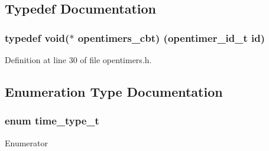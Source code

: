\subsection{Typedef Documentation}
\subsubsection[{\texorpdfstring{opentimers\+\_\+cbt}{opentimers_cbt}}]{\setlength{\rightskip}{0pt plus 5cm}typedef {\bf void}($\ast$ opentimers\+\_\+cbt) ({\bf opentimer\+\_\+id\+\_\+t} id)}\hypertarget{group___open_timers_ga93a6f1f7e03cd8ad88cbd9509db173cf}{}\label{group___open_timers_ga93a6f1f7e03cd8ad88cbd9509db173cf}


Definition at line 30 of file opentimers.\+h.



\subsection{Enumeration Type Documentation}
\subsubsection[{\texorpdfstring{time\+\_\+type\+\_\+t}{time_type_t}}]{\setlength{\rightskip}{0pt plus 5cm}enum {\bf time\+\_\+type\+\_\+t}}\hypertarget{group___open_timers_gad4702b7e72b77cd1d6cf3a63c0db9df8}{}\label{group___open_timers_gad4702b7e72b77cd1d6cf3a63c0db9df8}
\begin{Desc}
\item[Enumerator]\par
\begin{description}
\item[{\em 
T\+I\+M\+E\+\_\+\+MS\hypertarget{group___open_timers_ggad4702b7e72b77cd1d6cf3a63c0db9df8ab2234de0b81a6c02ab51dcfc63065bca}{}\label{group___open_timers_ggad4702b7e72b77cd1d6cf3a63c0db9df8ab2234de0b81a6c02ab51dcfc63065bca}
}]\item[{\em 
T\+I\+M\+E\+\_\+\+T\+I\+CS\hypertarget{group___open_timers_ggad4702b7e72b77cd1d6cf3a63c0db9df8a355f8cf3694e6ce36571b43db20b6717}{}\label{group___open_timers_ggad4702b7e72b77cd1d6cf3a63c0db9df8a355f8cf3694e6ce36571b43db20b6717}
}]\end{description}
\end{Desc}


